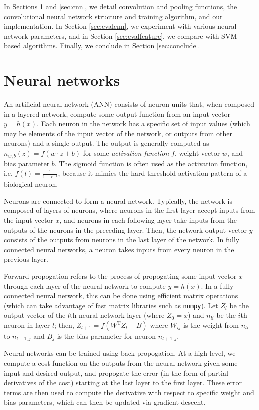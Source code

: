 \documentclass[10pt,twocolumn]{article}
\begin{document}
In Sections \ref{sec:neural} and \ref{sec:cnn}, we detail convolution and pooling functions, the convolutional neural network structure and training algorithm, and our implementation. In Section \ref{sec:evalcnn}, we experiment with various neural network parameters, and in Section \ref{sec:evalfeature}, we compare with SVM-based algorithms. Finally, we conclude in Section \ref{sec:conclude}.

\section{Neural networks} \label{sec:neural}

An artificial neural network (ANN) consists of neuron units that, when composed in a layered network, compute some output function from an input vector $y = h(x)$. Each neuron in the network has a specific set of input values (which may be elements of the input vector of the network, or outputs from other neurons) and a single output. The output is generally computed as $n_{w, b}(z) = f(w \cdot z + b)$ for some \emph{activation function} $f$, weight vector $w$, and bias parameter $b$. The sigmoid function is often used as the activation function, i.e. $f(l) = \frac{1}{1+e^{-l}}$, because it mimics the hard threshold activation pattern of a biological neuron.

Neurons are connected to form a neural network. Typically, the network is composed of layers of neurons, where neurons in the first layer accept inputs from the input vector $x$, and neurons in each following layer take inputs from the outputs of the neurons in the preceding layer. Then, the network output vector $y$ consists of the outputs from neurons in the last layer of the network. In fully connected neural networks, a neuron takes inputs from every neuron in the previous layer.

Forward propogation refers to the process of propogating some input vector $x$ through each layer of the neural network to compute $y = h(x)$. In a fully connected neural network, this can be done using efficient matrix operations (which can take advantage of fast matrix libraries such as \texttt{numpy}). Let $Z_l$ be the output vector of the $l$th neural network layer (where $Z_0 = x$) and $n_{li}$ be the $i$th neuron in layer $l$; then, $Z_{l+1} = f(W^{\text{T}} Z_l + B)$ where $W_{ij}$ is the weight from $n_{li}$ to $n_{l+1,j}$ and $B_j$ is the bias parameter for neuron $n_{l+1,j}$.

Neural networks can be trained using back propogation. At a high level, we compute a cost function on the outputs from the neural network given some input and desired output, and propogate the error (in the form of partial derivatives of the cost) starting at the last layer to the first layer. These error terms are then used to compute the derivative with respect to specific weight and bias parameters, which can then be updated via gradient descent.
\end{document}

